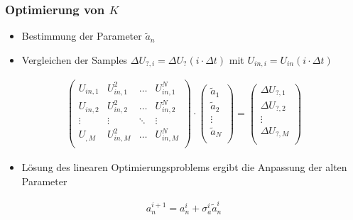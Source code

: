 \begin{frame}[fragile]
\frametitle{Optimierung von $K$}
\begin{itemize}
	\item Bestimmung der Parameter $\tilde{a}_n$
	\item Vergleichen der Samples ${\Delta U_{?,i} = \Delta U_? (i \cdot \Delta t)}$ mit ${U_{in,i} = U_{in}(i \cdot \Delta t)}$
\end{itemize}

\begin{align}
	\left( 
	\begin{matrix}
	 	U_{in,1} & U_{in,1}^2 & \dots & U_{in,1}^N \\
		U_{in,2} & U_{in,2}^2 & \dots & U_{in,2}^N \\
		\vdots & \vdots & \ddots & \vdots \\
		U_{,M} & U_{in,M}^2 & \dots & U_{in,M}^N \\
	\end{matrix}
	\right)
	\cdot
	\left(
	\begin{matrix}
		\tilde{a}_1 \\
		\tilde{a}_2 \\
		\vdots \\
		\tilde{a}_N \\	 
	\end{matrix}
	\right) = \left( 
	\begin{matrix}
		\Delta U_{?,1} \\
		\Delta U_{?,2} \\
		\vdots \\
		\Delta U_{?,M} \\	 
	\end{matrix}
	\right)
	\label{eq:Uquest.Gleichungssystem}
\end{align}

\begin{itemize}
	\item Lösung des linearen Optimierungsproblems ergibt die Anpassung der alten Parameter
\end{itemize}
\begin{align}
	a_n^{i+1} = a_n^{i} + \sigma_{a}^{i} \tilde{a}_n^{i}
\end{align}
\end{frame}


